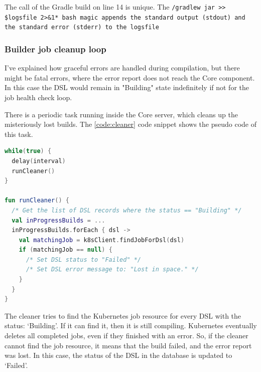 The call of the Gradle build on line 14 is unique. The \lstinline*./gradlew jar >> $logsfile 2>&1* bash magic appends the standard output (stdout) and the standard error (stderr) to the logsfile.

\subsubsection{Builder job cleanup loop}

I've explained how graceful errors are handled during compilation, but there might be fatal errors, where the error report does not reach the Core component. In this case the DSL would remain in "Building" state indefinitely if not for the job health check loop.

There is a periodic task running inside the Core server, which cleans up the misteriously lost builds. The \ref{code:cleaner} code snippet shows the pseudo code of this task.

\begin{lstlisting}[caption={Job cleaner loop},language=Kotlin,label=code:cleaner]
while(true) {
  delay(interval)
  runCleaner()
}

fun runCleaner() {
  /* Get the list of DSL records where the status == "Building" */
  val inProgressBuilds = ...
  inProgressBuilds.forEach { dsl ->
    val matchingJob = k8sClient.findJobForDsl(dsl)
    if (matchingJob == null) {
      /* Set DSL status to "Failed" */
      /* Set DSL error message to: "Lost in space." */
    }
  }
}
\end{lstlisting}

The cleaner tries to find the Kubernetes job resource for every DSL with the status: `Building'. If it can find it, then it is still compiling. Kubernetes eventually deletes all completed jobs, even if they finished with an error. So, if the cleaner cannot find the job resource, it means that the build failed, and the error report was lost. In this case, the status of the DSL in the database is updated to `Failed'.